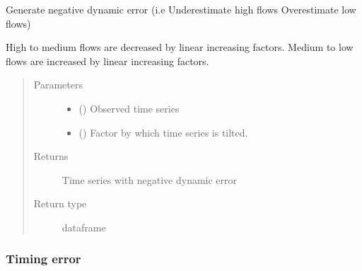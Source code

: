 \documentclass[letterpaper,10pt,english]{sphinxmanual}
\begin{document}
\begin{fulllineitems}
\label{\detokenize{reference/generate_errors:de.generate_errors.negative_dynamic}}
Generate negative dynamic error (i.e Underestimate high flows \sphinxhyphen{}
Overestimate low flows)

High to medium flows are decreased by linear increasing factors. Medium to
low flows are increased by linear increasing factors.
\begin{quote}\begin{description}
\item[{Parameters}] \leavevmode\begin{itemize}
\item {} 
 () \textendash{} Observed time series

\item {} 
 (\sphinxstyleliteralemphasis{\sphinxupquote{, }}) \textendash{} Factor by which time series is tilted.

\end{itemize}

\item[{Returns}] \leavevmode
{} \textendash{} Time series with negative dynamic error

\item[{Return type}] \leavevmode
dataframe

\end{description}\end{quote}

\end{fulllineitems}



\subsubsection{Timing error}
\label{\detokenize{reference/generate_errors:timing-error}}
\end{document}
